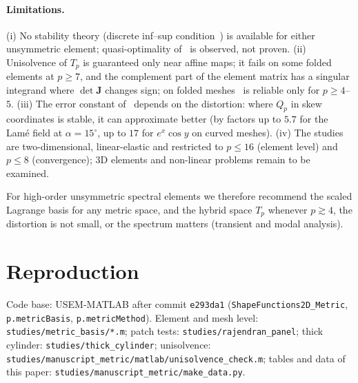 \paragraph{Limitations.} (i) No stability theory (discrete inf--sup
condition~\cite{Babuska1971Error}) is available for either unsymmetric element; quasi-optimality
of \PH\ is observed, not proven. (ii) Unisolvence of $T_p$ is guaranteed only near affine maps; it
fails on some folded elements at $p\ge7$, and the complement part of the element matrix has a
singular integrand where $\det\bm J$ changes sign; on folded meshes \PH\ is reliable only for
$p\ge4$--$5$. (iii) The error constant of \PH\ depends on the distortion: where $Q_p$ in skew
coordinates is stable, it can approximate better (by factors up to $5.7$ for the Lam\'e field at
$\alpha=15^\circ$, up to $17$ for $e^x\cos y$ on curved meshes). (iv) The studies are two-dimensional,
linear-elastic and restricted to $p\le16$ (element level) and $p\le8$ (convergence); 3D elements and
non-linear problems remain to be examined.

For high-order unsymmetric spectral elements we therefore recommend the scaled Lagrange basis
for any metric space, and the hybrid space $T_p$ whenever $p\gtrsim4$, the distortion is not
small, or the spectrum matters (transient and modal analysis).

\section*{Reproduction}\label{sec:reproduction}
Code base: USEM-MATLAB after commit \texttt{e293da1} (\texttt{ShapeFunctions2D\_Metric},
\texttt{p.metricBasis}, \texttt{p.metricMethod}). Element and mesh level:
\texttt{studies/metric\_basis/*.m}; patch tests: \texttt{studies/rajendran\_panel};
thick cylinder: \texttt{studies/thick\_cylinder}; unisolvence:
\texttt{studies/manuscript\_metric/matlab/unisolvence\_check.m}; tables and data of this paper:
\texttt{studies/manuscript\_metric/make\_data.py}.
